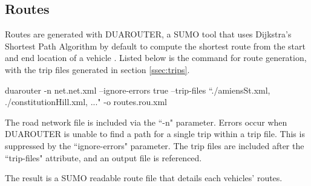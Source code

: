 \subsection{Routes}
Routes are generated with DUAROUTER, a \ac{SUMO} tool that uses Dijkstra's Shortest Path Algorithm by default to compute the shortest route from the start and end location of a vehicle \citep{2017DUAROUTER}. Listed below is the command for route generation, with the trip files generated in section \ref{ssec:trips}.

\begin{displayquote}
    duarouter -n net.net.xml --ignore-errors true --trip-files ``./amiensSt.xml, ./constitutionHill.xml, ..." -o routes.rou.xml
\end{displayquote}

The road network file is included via the ``-n" parameter. Errors occur when DUAROUTER is unable to find a path for a single trip within a trip file. This is suppressed by the ``ignore-errors" parameter. The trip files are included after the ``trip-files" attribute, and an output file is referenced.

The result is a \ac{SUMO} readable route file that details each vehicles' routes.